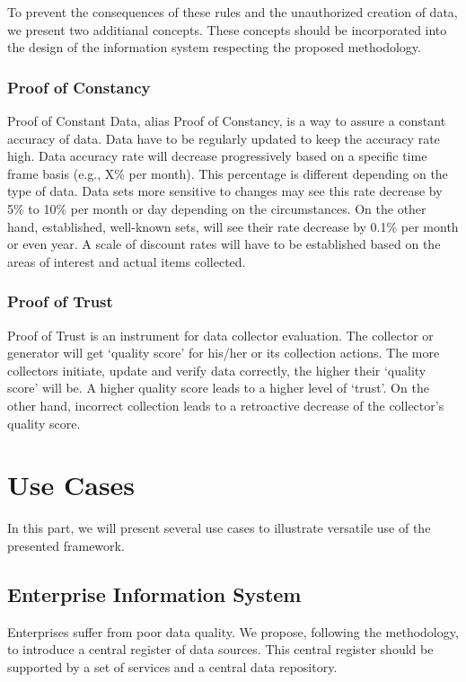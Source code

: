 To prevent the consequences of these rules and the unauthorized creation of data, we present two additianal concepts.
These concepts should be incorporated into the design of the information system respecting the proposed methodology.

\subsubsection{Proof of Constancy}

Proof of Constant Data, alias Proof of Constancy, is a way to assure a constant accuracy of data.
Data have to be regularly updated to keep the accuracy rate high.
Data accuracy rate will decrease progressively based on a specific time frame basis (e.g., X\% per month).
This percentage is different depending on the type of data.
Data sets more sensitive to changes may see this rate decrease by 5\% to 10\% per month or day depending on the circumstances.
On the other hand, established, well-known sets, will see their rate decrease by 0.1\% per month or even year.
A scale of discount rates will have to be established based on the areas of interest and actual items collected.

\subsubsection{Proof of Trust}

Proof of Trust is an instrument for data collector evaluation.
The collector or generator will get \enquote*{quality score} for his/her or its collection actions.
The more collectors initiate, update and verify data correctly, the higher their \enquote*{quality score} will be.
A higher quality score leads to a higher level of \enquote*{trust}.
On the other hand, incorrect collection leads to a retroactive decrease of the collector's quality score.

\section{Use Cases}

In this part, we will present several use cases to illustrate versatile use of the presented framework.

\subsection{Enterprise Information System}

Enterprises suffer from poor data quality.
We propose, following the methodology, to introduce a central register of data sources.
This central register should be supported by a set of services and a central data repository.


